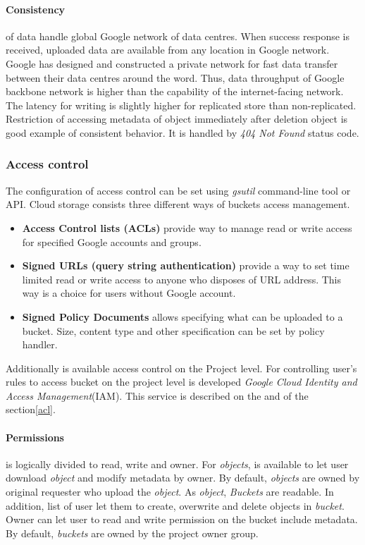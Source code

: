 \documentclass[a4paper,12pt,oneside]{report}
\begin{document}
	\paragraph{Consistency} of data handle global Google network of data centres. 
	When success response is received, uploaded data are available from any location
	in 
	Google network. Google has designed and constructed a private network 
	for fast data transfer between their data centres around the word. Thus, data
	throughput 
	of Google backbone network is higher than the capability of the 
	internet-facing network. The latency for writing is slightly higher for
	replicated store 
	than non-replicated. Restriction of accessing metadata of object immediately
	after deletion object is good example of consistent behavior.
	It is handled by \textit{404 Not Found} status code.
	
	
	\subsubsection{Access control}
	The configuration of access control can be set using \textit{gsutil}
	command-line tool 
	or API. Cloud storage consists three different ways of buckets access
	management.
	\begin{itemize}
		\item\textbf{Access Control lists (ACLs)} provide way to manage read or write
		access for specified Google accounts and groups.
		\item\textbf{Signed URLs (query string authentication)} provide a way to set time 
		limited read or write access to anyone who disposes of URL address. This way is
		a choice for users without Google account.   
		\item\textbf{Signed Policy Documents} allows specifying what can be uploaded to
		a bucket. 
		Size, content type and other specification can be set by policy handler. 
	\end{itemize}
	Additionally is available access control on the Project level. For controlling 
	user's rules 
	to access bucket on the project level is developed   \textit{Google Cloud
		Identity and Access Management}(IAM). This service is described on 
	the and of the section\ref{acl}.
	
	\paragraph{Permissions} is logically divided to read, write and owner. For
	\textit{objects}, 
	is available to let user download \textit{object} and modify metadata by owner.
	By default, \textit{objects} are owned by original requester who 
	upload the \textit{object}. As \textit{object}, \textit{Buckets} are readable.
	In addition, list of user let them to create, overwrite and delete objects 
	in \textit{bucket}. Owner can let user to read and write permission on the
	bucket include metadata. By default, \textit{buckets} are owned by the project 
	owner group.
	
\end{document}
